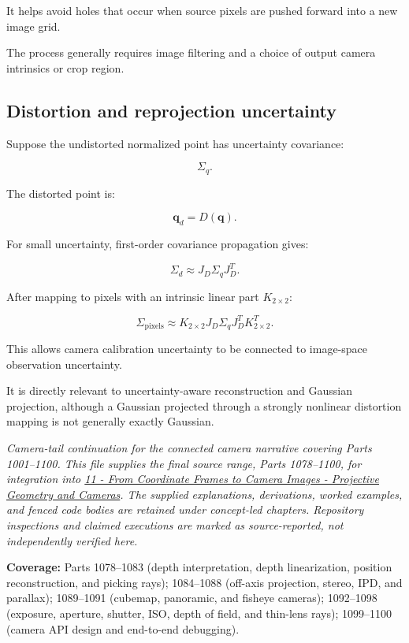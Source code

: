 It helps avoid holes that occur when source pixels are pushed forward into a new image grid.

The process generally requires image filtering and a choice of output camera intrinsics or crop region.

\subsection{Distortion and reprojection uncertainty}\label{02-foundations-ii-ch035-distortion-and-reprojection-uncertainty}

Suppose the undistorted normalized point has uncertainty covariance:

\[
 \Sigma_q.
\]

The distorted point is:

\[
 \mathbf q_d=D(\mathbf q).
\]

For small uncertainty, first-order covariance propagation gives:

\[
 \boxed{ \Sigma_d\approx J_D\Sigma_qJ_D^T }.
\]

After mapping to pixels with an intrinsic linear part \(K_{2\times2}\):

\[
 \boxed{ \Sigma_{\mathrm{pixels}} \approx K_{2\times2} J_D\Sigma_qJ_D^T K_{2\times2}^T }.
\]

This allows camera calibration uncertainty to be connected to image-space observation uncertainty.

It is directly relevant to uncertainty-aware reconstruction and Gaussian projection, although a Gaussian projected through a strongly nonlinear distortion mapping is not generally exactly Gaussian.

\emph{Camera-tail continuation for the connected camera narrative covering Parts 1001--1100. This file supplies the final source range, Parts 1078--1100, for integration into \hyperref[02-foundations-ii-ch032-a-coordinate-is-a-claim-about-a-frame]{11 - From Coordinate Frames to Camera Images - Projective Geometry and Cameras}. The supplied explanations, derivations, worked examples, and fenced code bodies are retained under concept-led chapters. Repository inspections and claimed executions are marked as source-reported, not independently verified here.}

\textbf{Coverage:} Parts 1078--1083 (depth interpretation, depth linearization, position reconstruction, and picking rays); 1084--1088 (off-axis projection, stereo, IPD, and parallax); 1089--1091 (cubemap, panoramic, and fisheye cameras); 1092--1098 (exposure, aperture, shutter, ISO, depth of field, and thin-lens rays); 1099--1100 (camera API design and end-to-end debugging).

